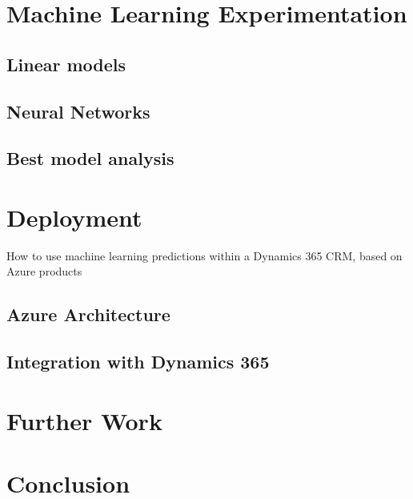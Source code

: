 \section{Machine Learning Experimentation}
\lipsum[1]

\subsection{Linear models}
\lipsum[2]

\subsection{Neural Networks}
\lipsum[3]

\subsection{Best model analysis}
\lipsum[3]


\section{Deployment}
How to use machine learning predictions within a Dynamics 365 CRM, based on Azure products

\subsection{Azure Architecture}
\lipsum[2]

\subsection{Integration with Dynamics 365}
\lipsum[3]


\section{Further Work}
\lipsum[1]

\section{Conclusion}
\lipsum[1]